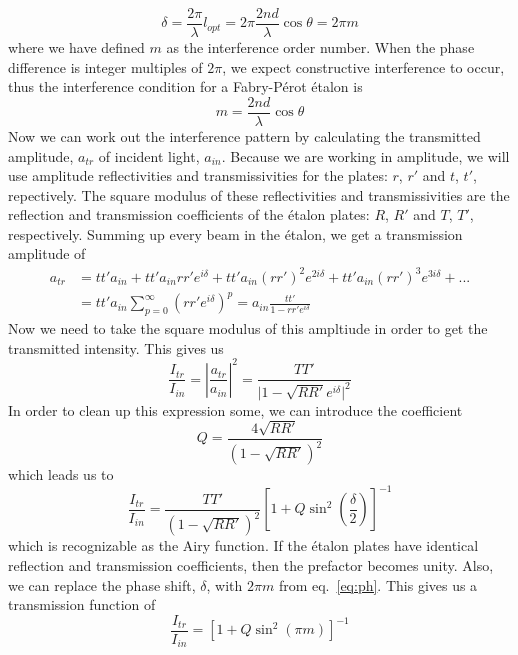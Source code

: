 \documentclass{article}
\begin{document}
\begin{equation}
\delta = \frac{2\pi}{\lambda}l_{opt}=2\pi \frac{2nd}{\lambda}\cos{\theta}=2\pi m
\label{eq:ph}
\end{equation}
where we have defined $m$ as the interference order number. When the phase difference is integer multiples of $2\pi$, we expect constructive interference to occur, thus the interference condition for a Fabry-P\'{e}rot \'{e}talon is
\begin{equation}
m=\frac{2nd}{\lambda}\cos{\theta}
\label{eq:int_con}
\end{equation}
Now we can work out the interference pattern by calculating the transmitted amplitude, $a_{tr}$ of incident light, $a_{in}$. Because we are working in amplitude, we will use amplitude reflectivities and transmissivities for the plates: $r$, $r'$ and $t$, $t'$, repectively. The square modulus of these reflectivities and transmissivities are the reflection and transmission coefficients of the \'{e}talon plates: $R$, $R'$ and $T$, $T'$, respectively. Summing up every beam in the \'{e}talon, we get a transmission amplitude of
\begin{align*}
a_{tr}&=tt'a_{in}+tt'a_{in}rr'e^{i\delta}+tt'a_{in}(rr')^{2}e^{2i\delta}+tt'a_{in}(rr')^{3}e^{3i\delta}+...\\
&=tt'a_{in}\sum_{p=0}^{\infty}(rr'e^{i\delta})^{p}=a_{in}\frac{tt'}{1-rr'e^{i\delta}}
\end{align*}
Now we need to take the square modulus of this ampltiude in order to get the transmitted intensity. This gives us
\begin{equation}
\frac{I_{tr}}{I_{in}}=\left|\frac{a_{tr}}{a_{in}}\right|^{2}=\frac{TT'}{\big|1-\sqrt{RR'}e^{i\delta}\big|^{2}}
\end{equation}
In order to clean up this expression some, we can introduce the coefficient
\begin{equation}
Q=\frac{4\sqrt{RR'}}{(1-\sqrt{RR'})^{2}}
\end{equation}
which leads us to
\begin{equation}
\frac{I_{tr}}{I_{in}}=\frac{TT'}{(1-\sqrt{RR'})^{2}}\left[1+Q\sin^{2}{\left(\frac{\delta}{2}\right)}\right]^{-1}
\end{equation}
which is recognizable as the Airy function. If the \'{e}talon plates have identical reflection and transmission coefficients, then the prefactor becomes unity. Also, we can replace the phase shift, $\delta$, with $2\pi m$ from eq.~\ref{eq:ph}. This gives us a transmission function of
\begin{equation}
\frac{I_{tr}}{I_{in}}=[1+Q\sin^{2}{(\pi m)}]^{-1}
\label{eq:airy}
\end{equation}
\end{document}
